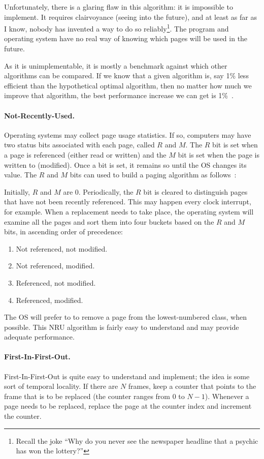 Unfortunately, there is a glaring flaw in this algorithm: it is impossible to implement. It requires clairvoyance (seeing into the future), and at least as far as I know, nobody has invented a way to do so reliably\footnote{Recall the joke ``Why do you never see the newspaper headline that a psychic has won the lottery?''}. The program and operating system have no real way of knowing which pages will be used in the future.

As it is unimplementable, it is mostly a benchmark against which other algorithms can be compared. If we know that a given algorithm is, say 1\% less efficient than the hypothetical optimal algorithm, then no matter how much we improve that algorithm, the best performance increase we can get is 1\%~\cite{mos}.

\paragraph{Not-Recently-Used.}
Operating systems may collect page usage statistics. If so, computers may have two status bits associated with each page, called $R$ and $M$. The $R$ bit is set when a page is referenced (either read or written) and the $M$ bit is set when the page is written to (modified). Once a bit is set, it remains so until the OS changes its value. The $R$ and $M$ bits can used to build a paging algorithm as follows~\cite{mos}:

Initially, $R$ and $M$ are 0. Periodically, the $R$ bit is cleared to distinguish pages that have not been recently referenced. This may happen every clock interrupt, for example. When a replacement needs to take place, the operating system will examine all the pages and sort them into four buckets based on the $R$ and $M$ bits, in ascending order of precedence:

\begin{enumerate}
	\item Not referenced, not modified.
	\item Not referenced, modified.
	\item Referenced, not modified.
	\item Referenced, modified.
\end{enumerate}

The OS will prefer to to remove a page from the lowest-numbered class, when possible. This NRU algorithm is fairly easy to understand and may provide adequate performance.

\paragraph{First-In-First-Out.}
First-In-First-Out is quite easy to understand and implement; the idea is some sort of temporal locality. If there are $N$ frames, keep a counter that points to the frame that is to be replaced (the counter ranges from $0$ to $N-1$). Whenever a page needs to be replaced, replace the page at the counter index and increment the counter. 

